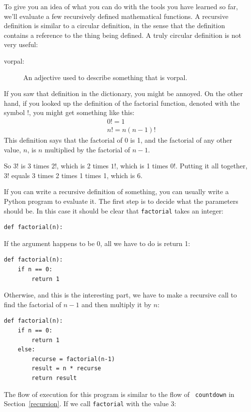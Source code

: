 \documentclass[10pt]{book}
\begin{document}
\begin{CJK}{UTF8}{gbsn}
To give you an idea of what you can do with the tools you have learned
so far, we'll evaluate a few recursively defined mathematical
functions.  A recursive definition is similar to a circular
definition, in the sense that the definition contains a reference to
the thing being defined.  A truly circular definition is not very
useful:

\begin{description}

\item[vorpal:] An adjective used to describe something that is vorpal.

\end{description}

If you saw that definition in the dictionary, you might be annoyed. On
the other hand, if you looked up the definition of the factorial
function, denoted with the symbol $!$, you might get something like
this:
%
\begin{eqnarray*}
&&  0! = 1 \\
&&  n! = n (n-1)!
\end{eqnarray*}
%
This definition says that the factorial of 0 is 1, and the factorial
of any other value, $n$, is $n$ multiplied by the factorial of $n-1$.

So $3!$ is 3 times $2!$, which is 2 times $1!$, which is 1 times
$0!$. Putting it all together, $3!$ equals 3 times 2 times 1 times 1,
which is 6.

If you can write a recursive definition of something, you can usually
write a Python program to evaluate it. The first step is to decide
what the parameters should be.  In this case it should be clear
that {\tt factorial} takes an integer:

\begin{verbatim}
def factorial(n):
\end{verbatim}
%
If the argument happens to be 0, all we have to do is return 1:

\begin{verbatim}
def factorial(n):
    if n == 0:
        return 1
\end{verbatim}
%
Otherwise, and this is the interesting part, we have to make a
recursive call to find the factorial of $n-1$ and then multiply it by
$n$:

\begin{verbatim}
def factorial(n):
    if n == 0:
        return 1
    else:
        recurse = factorial(n-1)
        result = n * recurse
        return result
\end{verbatim}
%
The flow of execution for this program is similar to the flow of {\tt
countdown} in Section~\ref{recursion}.  If we call {\tt factorial}
with the value 3:


\end{CJK}
\end{document}
